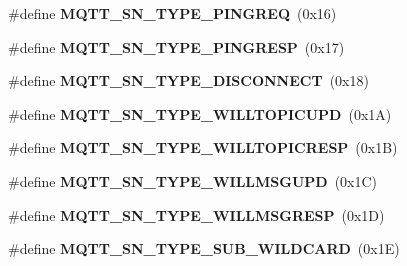 \begin{DoxyCompactItemize}
\item 
\hypertarget{group__MQTT__SN__CONTROL_ga24c4412f26f5db3dabc57c8511690a7b}{\#define {\bfseries M\+Q\+T\+T\+\_\+\+S\+N\+\_\+\+T\+Y\+P\+E\+\_\+\+P\+I\+N\+G\+R\+E\+Q}~(0x16)}\label{group__MQTT__SN__CONTROL_ga24c4412f26f5db3dabc57c8511690a7b}

\item 
\hypertarget{group__MQTT__SN__CONTROL_ga104849c06dad11e57805341ca6394513}{\#define {\bfseries M\+Q\+T\+T\+\_\+\+S\+N\+\_\+\+T\+Y\+P\+E\+\_\+\+P\+I\+N\+G\+R\+E\+S\+P}~(0x17)}\label{group__MQTT__SN__CONTROL_ga104849c06dad11e57805341ca6394513}

\item 
\hypertarget{group__MQTT__SN__CONTROL_gaeb18a759d020c1443a602636204c6fdd}{\#define {\bfseries M\+Q\+T\+T\+\_\+\+S\+N\+\_\+\+T\+Y\+P\+E\+\_\+\+D\+I\+S\+C\+O\+N\+N\+E\+C\+T}~(0x18)}\label{group__MQTT__SN__CONTROL_gaeb18a759d020c1443a602636204c6fdd}

\item 
\hypertarget{group__MQTT__SN__CONTROL_gae34bbdc05e79d37cc1f2060a885c3e05}{\#define {\bfseries M\+Q\+T\+T\+\_\+\+S\+N\+\_\+\+T\+Y\+P\+E\+\_\+\+W\+I\+L\+L\+T\+O\+P\+I\+C\+U\+P\+D}~(0x1\+A)}\label{group__MQTT__SN__CONTROL_gae34bbdc05e79d37cc1f2060a885c3e05}

\item 
\hypertarget{group__MQTT__SN__CONTROL_ga3181a18a9d476f1ca97a1bc935c8b712}{\#define {\bfseries M\+Q\+T\+T\+\_\+\+S\+N\+\_\+\+T\+Y\+P\+E\+\_\+\+W\+I\+L\+L\+T\+O\+P\+I\+C\+R\+E\+S\+P}~(0x1\+B)}\label{group__MQTT__SN__CONTROL_ga3181a18a9d476f1ca97a1bc935c8b712}

\item 
\hypertarget{group__MQTT__SN__CONTROL_ga63c970e654cb17f2a30294a719b11b71}{\#define {\bfseries M\+Q\+T\+T\+\_\+\+S\+N\+\_\+\+T\+Y\+P\+E\+\_\+\+W\+I\+L\+L\+M\+S\+G\+U\+P\+D}~(0x1\+C)}\label{group__MQTT__SN__CONTROL_ga63c970e654cb17f2a30294a719b11b71}

\item 
\hypertarget{group__MQTT__SN__CONTROL_ga855273768c5808acc67a07b8c4b6f5fa}{\#define {\bfseries M\+Q\+T\+T\+\_\+\+S\+N\+\_\+\+T\+Y\+P\+E\+\_\+\+W\+I\+L\+L\+M\+S\+G\+R\+E\+S\+P}~(0x1\+D)}\label{group__MQTT__SN__CONTROL_ga855273768c5808acc67a07b8c4b6f5fa}

\item 
\hypertarget{group__MQTT__SN__CONTROL_gaccc43fa2c1468ee81b07ca73265057e0}{\#define {\bfseries M\+Q\+T\+T\+\_\+\+S\+N\+\_\+\+T\+Y\+P\+E\+\_\+\+S\+U\+B\+\_\+\+W\+I\+L\+D\+C\+A\+R\+D}~(0x1\+E)}\label{group__MQTT__SN__CONTROL_gaccc43fa2c1468ee81b07ca73265057e0}


\end{DoxyCompactItemize}
